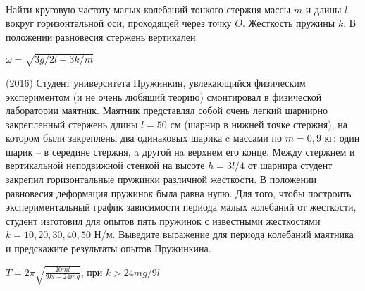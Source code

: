 \begin{samepage}
\begin{ex}
\hspace{0pt} \\
\begin{minipage}{.65\textwidth} 
Найти круговую частоту малых колебаний тонкого стержня массы $m$ и длины $l$ вокруг горизонтальной оси, проходящей через точку $O$. 
Жесткость пружины $k$. В положении равновесия стержень вертикален.
\end{minipage}
\begin{minipage}{.35\textwidth}
\centering

\end{minipage}
\begin{ans}
$\omega = \sqrt{3g/2l+3k/m}$
\end{ans}
\end{ex}
\end{samepage}

\begin{ex}
(2016) Студент университета Пружинкин, увлекающийся физическим экспериментом (и не очень любящий теорию) смонтировал в физической лаборатории маятник. Маятник представлял собой очень легкий шарнирно закрепленный стержень длины $l = 50$ см (шарнир в нижней точке стержня), на котором были закреплены два одинаковых шарика c массами по $m = 0,9$ кг: один шарик -- в середине стержня, a другой нa верхнем его конце. Между стержнем и вертикальной неподвижной стенкой на высоте $h=3l/4$ от шарнира студент закрепил горизонтальные пружинки различной жесткости. В положении равновесия деформация пружинок была равна нулю. Для того, чтобы построить экспериментальный график зависимости периода малых колебаний от жесткости, студент изготовил для опытов пять пружинок с известными жесткостями $k = 10, 20, 30, 40, 50$ Н/м. Выведите выражение для периода колебаний маятника и предскажите результаты опытов Пружинкина.
\begin{center}

\end{center}
\begin{ans}
$T=2\pi \sqrt{\frac{20ml}{9kl-24mg}}$, при $k>24mg/9l$
\end{ans}
\end{ex}

